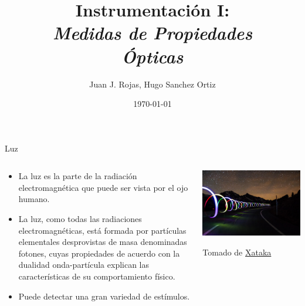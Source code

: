\documentclass[aspectratio=169]{beamer}
\title{Instrumentación I: \\ \emph{Medidas de Propiedades}\\ \emph{Ópticas}}
\author{
    Juan J. Rojas, Hugo Sanchez Ortiz
}
\institute{Instituto Tecnológico de Costa Rica}
\date{\today}
\begin{document}

\maketitle

\newcommand{\blackandwhite}{white} %

\begin{frame}{Luz}
        \begin{columns}[c, onlytextwidth]
        \begin{column}{0.55\textwidth}
            \begin{itemize}
                \item La luz es la parte de la radiación electromagnética que puede ser vista por el ojo humano. 
                \item  La luz, como todas las radiaciones electromagnéticas, está formada por partículas elementales desprovistas de masa denominadas fotones, cuyas propiedades de acuerdo con la dualidad onda-partícula explican las características de su comportamiento físico.
                \item Puede detectar una gran variedad de estímulos. 
            \end{itemize}
        \end{column}
        \begin{column}{0.45\textwidth}
            \centering
            \includegraphics[width = 0.9\linewidth]{fig/Optica/Luz.jpg}
            
            \tiny{Tomado de \href{https://www.xataka.com/espacio/que-viajar-a-velocidad-luz-teoricamente-imposible-1}{Xataka}}
            
        \end{column}
    \end{columns}
\end{frame}
\end{document}
